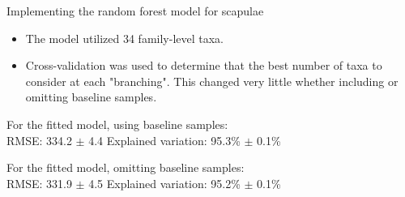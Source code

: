\documentclass{beamer}
\begin{document}
\begin{frame}{Implementing the random forest model for scapulae}

\begin{itemize}
\item The model utilized 34 family-level taxa.
\item Cross-validation was used to determine that the best number of
  taxa to consider at each "branching".  This changed very little
  whether including or omitting baseline samples.
\end{itemize}

\vspace{0.1in}

\noindent For the fitted model, using baseline samples:\\
\noindent RMSE: 334.2 $\pm$ 4.4  \hspace{0.05in}  Explained variation: 95.3\%
$\pm$ 0.1\%

\vspace{0.1in}

\noindent For the fitted model, omitting baseline samples:\\
\noindent RMSE: 331.9 $\pm$ 4.5  \hspace{0.05in}  Explained variation: 95.2\%
$\pm$ 0.1\%

\end{frame}
\end{document}
